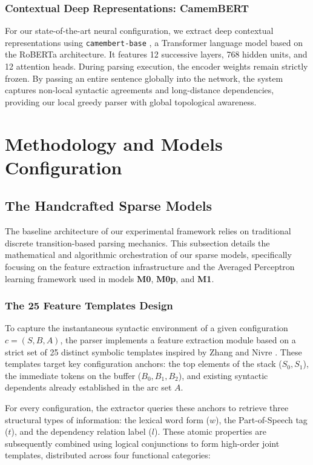 \documentclass[12pt,a4paper]{article}
\begin{document}
\subsubsection{Contextual Deep Representations: CamemBERT}
For our state-of-the-art neural configuration, we extract deep contextual representations using \texttt{camembert-base} \cite{martin2020camembert}, a Transformer language model based on the RoBERTa architecture. It features 12 successive layers, 768 hidden units, and 12 attention heads. During parsing execution, the encoder weights remain strictly frozen. By passing an entire sentence globally into the network, the system captures non-local syntactic agreements and long-distance dependencies, providing our local greedy parser with global topological awareness.

\section{Methodology and Models Configuration}
\subsection{The Handcrafted Sparse Models}
\label{subsec:handcrafted_sparse_models}

The baseline architecture of our experimental framework relies on traditional discrete transition-based parsing mechanics. This subsection details the mathematical and algorithmic orchestration of our sparse models, specifically focusing on the feature extraction infrastructure and the Averaged Perceptron learning framework used in models \textbf{M0}, \textbf{M0p}, and \textbf{M1}.

\subsubsection{The 25 Feature Templates Design}
To capture the instantaneous syntactic environment of a given configuration $c = (S, B, A)$, the parser implements a feature extraction module based on a strict set of 25 distinct symbolic templates inspired by Zhang and Nivre \cite{zhang2011transition}. These templates target key configuration anchors: the top elements of the stack ($S_0, S_1$), the immediate tokens on the buffer ($B_0, B_1, B_2$), and existing syntactic dependents already established in the arc set $A$.

For every configuration, the extractor queries these anchors to retrieve three structural types of information: the lexical word form ($w$), the Part-of-Speech tag ($t$), and the dependency relation label ($l$). These atomic properties are subsequently combined using logical conjunctions to form high-order joint templates, distributed across four functional categories:
\end{document}
